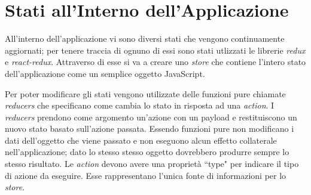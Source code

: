 \section{Stati all'Interno dell'Applicazione}
All'interno dell'applicazione vi sono diversi stati che vengono continuamente aggiornati; per tenere traccia di ognuno di essi sono stati utlizzati le librerie \textit{redux} e \textit{react-redux}.
Attraverso di esse si va a creare uno \textit{store} che contiene l'intero stato dell'applicazione come un semplice oggetto JavaScript. 

Per poter modificare gli stati vengono utilizzate delle funzioni pure chiamate
\textit{reducers} che specificano come cambia lo stato in risposta ad una \textit{action}. I \textit{reducers} prendono come argomento un'azione con un payload e restituiscono un nuovo stato basato sull'azione passata. Essendo funzioni pure non modificano i dati
dell'oggetto che viene passato e non eseguono alcun effetto collaterale nell'applicazione; dato lo stesso stesso oggetto dovrebbero produrre sempre lo stesso risultato.
Le \textit{action} devono avere una propriet\`a ``type" per indicare il tipo di azione da eseguire. Esse rappresentano l'unica fonte di informazioni per lo \textit{store}\cite{ReduxSite}.

